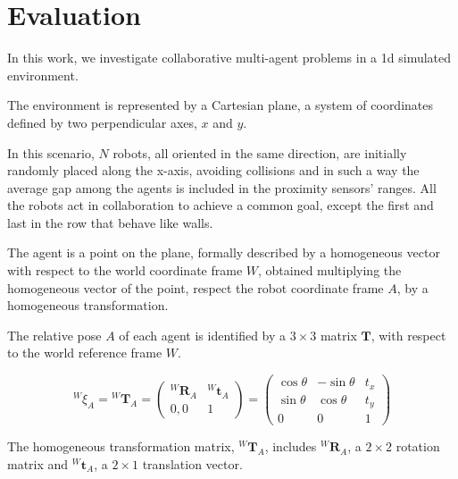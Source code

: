 \chapter{Evaluation}
\label{chap:experiments}


In this work, we investigate collaborative multi-agent problems in a \gls{1d} 
simulated environment.

The environment is represented by a Cartesian plane, a system of coordinates
defined by two perpendicular axes, $x$ and $y$. 

In this scenario, $N$ robots, all oriented in the same direction, are initially 
randomly placed along the x-axis, avoiding collisions and in such a way the 
average gap among the agents is included in the proximity sensors' ranges. 
All the robots act in collaboration to achieve a common goal, except the first 
and last in the row that behave like walls.

The agent is a point on the plane, formally described by a homogeneous vector 
with respect to the world coordinate frame $W$, obtained multiplying the 
homogeneous vector of the point, respect the robot coordinate frame $A$, by a 
homogeneous transformation. 

The relative pose $A$ of each agent is identified by a $3 \times 3$ matrix 
$\mathbf{T}$, with respect to the world reference frame $W$. 

\begin{Equation}[!htb]
	\centering
	\begin{equation}
	{^W\!\xi_A} = {^W\!\mathbf{T}_A} 
	=
	\begin{pmatrix}
	^W\!\mathbf{R}_A & ^W\!\mathbf{t}_A\\
	0, 0 & 1
	\end{pmatrix}
	=
	\begin{pmatrix}
	\cos \theta & - \sin \theta & t_x\\
	\sin \theta & \cos \theta & t_y\\
	0 & 0 & 1
	\end{pmatrix}
	\end{equation}
	\caption[Homogeneous transformation matrix.]{The homogeneous 
	transformation matrix, 	$^W\!\mathbf{T}_A$, includes $^W\!\mathbf{R}_A$, a 
	$2 \times 2$ rotation matrix and $^W\!\mathbf{t}_A$, a $2 \times 1$ 
	translation vector.}
	\label{eq:hommatrix}
\end{Equation}

